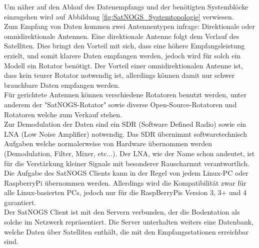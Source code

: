 Um näher auf den Ablauf des Datenempfangs und der benötigten Systemblöcke einzugehen wird auf Abbildung \ref{fig:SatNOGS_Systemtopologie} verwiesen.\\

Zum Empfang von Daten kommen zwei Antennentypen infrage: Direktionale oder omnidirektionale Antennen. Eine direktionale Antenne folgt dem Verlauf des Satelliten. Dies bringt den Vorteil mit sich, dass eine höhere Empfangsleistung erzielt, und somit klarere Daten empfangen werden, jedoch wird für solch ein Modell ein Rotator benötigt. Der Vorteil einer omnidirektionalen Antenne ist, dass kein teurer Rotator notwendig ist, allerdings können damit nur schwer brauchbare Daten empfangen werden.\\

Für gerichtete Antennen können verschiedene Rotatoren benutzt werden, unter anderem der "SatNOGS-Rotator" sowie diverse Open-Source-Rotatoren und Rotatoren welche zum Verkauf stehen.\\

Zur Demodulation der Daten sind ein SDR (Software Defined Radio) sowie ein LNA (Low Noise Amplifier) notwendig. Das SDR übernimmt softwaretechnisch Aufgaben welche normalerweise von Hardware übernommen werden (Demodulation, Filter, Mixer, etc...). Der LNA, wie der Name schon andeutet, ist für die Verstärkung kleiner Signale mit besonderer Rauscharmut verantwortlich. \\

Die Aufgabe des SatNOGS Clients kann in der Regel von jedem Linux-PC oder RaspberryPi übernommen werden. Allerdings wird die Kompatibilität zwar für alle Linux-basierten PCs, jedoch nur für die RaspBerryPis Version 3, 3+ und 4 garantiert.\\

Der SatNOGS Client ist mit den Servern verbunden, der die Bodentation als solche im Netzwerk repräsentiert. Die Server unterhalten weiters eine Datenbank, welche Daten über Satelliten enthält, die mit den Empfangsstationen erreichbar sind.
\pagebreak